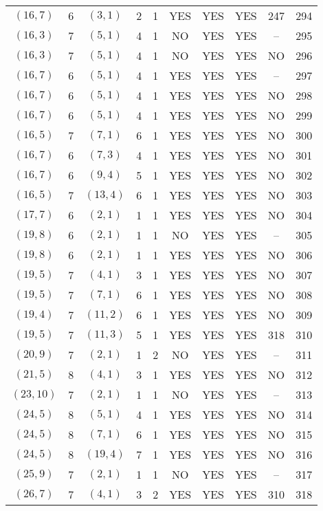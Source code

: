 \begin{longtable}{|c|c|c|c|c|c|c|c|c|c|}
$(16, 7)$ & 6 & $(3, 1)$ & 2 & 1 & YES & YES & YES & 247 & 294\\
$(16, 3)$ & 7 & $(5, 1)$ & 4 & 1 & NO & YES & YES & -- & 295\\
$(16, 3)$ & 7 & $(5, 1)$ & 4 & 1 & NO & YES & YES & NO & 296\\
$(16, 7)$ & 6 & $(5, 1)$ & 4 & 1 & YES & YES & YES & -- & 297\\
$(16, 7)$ & 6 & $(5, 1)$ & 4 & 1 & YES & YES & YES & NO & 298\\
$(16, 7)$ & 6 & $(5, 1)$ & 4 & 1 & YES & YES & YES & NO & 299\\
$(16, 5)$ & 7 & $(7, 1)$ & 6 & 1 & YES & YES & YES & NO & 300\\
$(16, 7)$ & 6 & $(7, 3)$ & 4 & 1 & YES & YES & YES & NO & 301\\
$(16, 7)$ & 6 & $(9, 4)$ & 5 & 1 & YES & YES & YES & NO & 302\\
$(16, 5)$ & 7 & $(13, 4)$ & 6 & 1 & YES & YES & YES & NO & 303\\
$(17, 7)$ & 6 & $(2, 1)$ & 1 & 1 & YES & YES & YES & NO & 304\\
$(19, 8)$ & 6 & $(2, 1)$ & 1 & 1 & NO & YES & YES & -- & 305\\
$(19, 8)$ & 6 & $(2, 1)$ & 1 & 1 & YES & YES & YES & NO & 306\\
$(19, 5)$ & 7 & $(4, 1)$ & 3 & 1 & YES & YES & YES & NO & 307\\
$(19, 5)$ & 7 & $(7, 1)$ & 6 & 1 & YES & YES & YES & NO & 308\\
$(19, 4)$ & 7 & $(11, 2)$ & 6 & 1 & YES & YES & YES & NO & 309\\
$(19, 5)$ & 7 & $(11, 3)$ & 5 & 1 & YES & YES & YES & 318 & 310\\
$(20, 9)$ & 7 & $(2, 1)$ & 1 & 2 & NO & YES & YES & -- & 311\\
$(21, 5)$ & 8 & $(4, 1)$ & 3 & 1 & YES & YES & YES & NO & 312\\
$(23, 10)$ & 7 & $(2, 1)$ & 1 & 1 & NO & YES & YES & -- & 313\\
$(24, 5)$ & 8 & $(5, 1)$ & 4 & 1 & YES & YES & YES & NO & 314\\
$(24, 5)$ & 8 & $(7, 1)$ & 6 & 1 & YES & YES & YES & NO & 315\\
$(24, 5)$ & 8 & $(19, 4)$ & 7 & 1 & YES & YES & YES & NO & 316\\
$(25, 9)$ & 7 & $(2, 1)$ & 1 & 1 & NO & YES & YES & -- & 317\\
$(26, 7)$ & 7 & $(4, 1)$ & 3 & 2 & YES & YES & YES & 310 & 318\\

\end{longtable}
